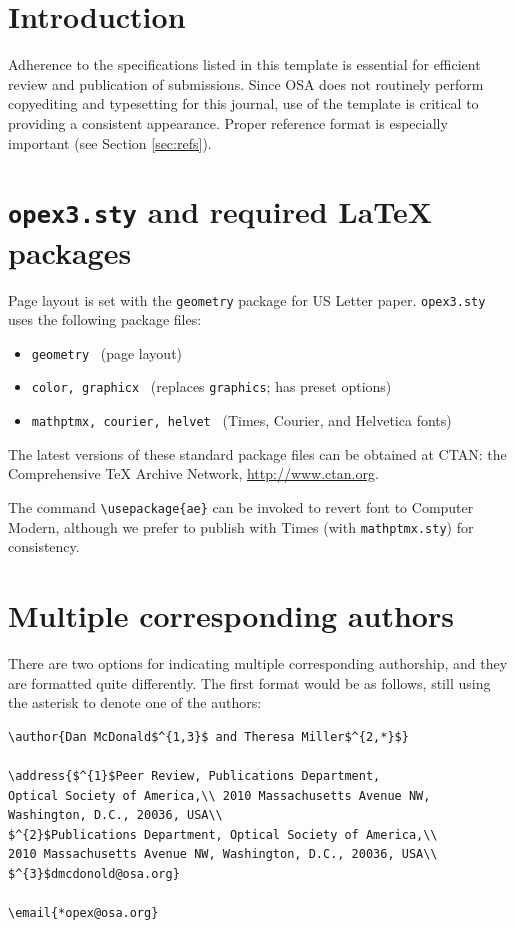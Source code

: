 \documentclass[10pt,letterpaper]{article}
\begin{document}
\section{Introduction}
Adherence to the specifications listed in this template is essential for efficient review and publication of submissions. Since OSA does not routinely perform copyediting and typesetting for this journal, use of the template is critical to providing a consistent appearance. Proper reference format is especially important (see Section \ref{sec:refs}).

\section{\texttt{opex3.sty} and required \LaTeX{} packages}
Page layout is set with the \texttt{geometry} package for US Letter paper. \texttt{opex3.sty} uses the following package files:

\begin{itemize}
\item \texttt{geometry} \ (page layout)
\item \texttt{color, graphicx} \ (replaces \texttt{graphics}; has preset options)
\item \texttt{mathptmx, courier, helvet} \ (Times, Courier, and Helvetica fonts)
\end{itemize}

The latest versions of these standard package files can be obtained at CTAN: the Comprehensive TeX Archive Network, \url{http://www.ctan.org}.

The command \verb+\usepackage{ae}+ can be invoked to revert font to Computer Modern, although we prefer to publish with Times (with \texttt{mathptmx.sty}) for consistency.

\section{Multiple corresponding authors}

There are two options for indicating multiple corresponding authorship, and they are formatted quite differently. The first format would be as follows, still using the asterisk to denote one of the authors:

\begin{verbatim}
\author{Dan McDonald$^{1,3}$ and Theresa Miller$^{2,*}$}

\address{$^{1}$Peer Review, Publications Department,
Optical Society of America,\\ 2010 Massachusetts Avenue NW,
Washington, D.C., 20036, USA\\
$^{2}$Publications Department, Optical Society of America,\\
2010 Massachusetts Avenue NW, Washington, D.C., 20036, USA\\
$^{3}$dmcdonold@osa.org}

\email{*opex@osa.org}
\end{verbatim}
\end{document}
